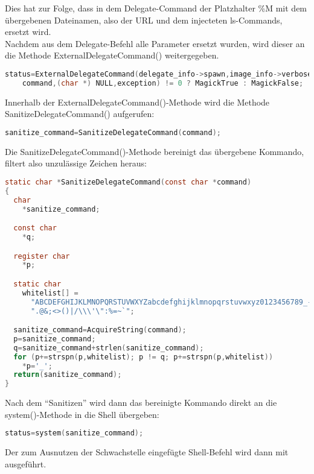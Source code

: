 Dies hat zur Folge, dass in dem Delegate-Command der Platzhalter \%M mit dem übergebenen Dateinamen,
also der URL und dem injecteten ls-Commands, ersetzt wird.\\

Nachdem aus dem Delegate-Befehl alle Parameter ersetzt wurden, wird dieser an die Methode ExternalDelegateCommand() weitergegeben.

\begin{lstlisting}[firstnumber=1301, language=C, caption=magick/delegate.c Aufruf ExternalDelegateCommand(),label={lst:lstlisting}]
  status=ExternalDelegateCommand(delegate_info->spawn,image_info->verbose,
    command,(char *) NULL,exception) != 0 ? MagickTrue : MagickFalse;
\end{lstlisting}
\vspace{5mm}

Innerhalb der ExternalDelegateCommand()-Methode wird die Methode SanitizeDelegateCommand() aufgerufen:\\

\begin{lstlisting}[firstnumber=395, language=C, caption=magick/delegate.c Aufruf SanitizeDelegateCommand(),label={lst:lstlisting}]
  sanitize_command=SanitizeDelegateCommand(command);
\end{lstlisting}
\vspace{5mm}

Die SanitizeDelegateCommand()-Methode bereinigt das übergebene Kommando, filtert also unzulässige Zeichen heraus:\\

\begin{lstlisting}[firstnumber=322, language=C, caption=magick/delegate.c SanitizieDelegateCommand(),label={lst:lstlisting}]
static char *SanitizeDelegateCommand(const char *command)
{
  char
    *sanitize_command;

  const char
    *q;

  register char
    *p;

  static char
    whitelist[] =
      "ABCDEFGHIJKLMNOPQRSTUVWXYZabcdefghijklmnopqrstuvwxyz0123456789_- "
      ".@&;<>()|/\\\'\":%=~`";

  sanitize_command=AcquireString(command);
  p=sanitize_command;
  q=sanitize_command+strlen(sanitize_command);
  for (p+=strspn(p,whitelist); p != q; p+=strspn(p,whitelist))
    *p='_';
  return(sanitize_command);
}
\end{lstlisting}
\vspace{5mm}

Nach dem "`Sanitizen"' wird dann das bereinigte Kommando direkt an die system()-Methode in die Shell übergeben:\\

\begin{lstlisting}[firstnumber=402, language=C, caption=magick/delegate.c Aufruf system(),label={lst:lstlisting}]
  status=system(sanitize_command);
\end{lstlisting}
\vspace{5mm}

Der zum Ausnutzen der Schwachstelle eingefügte Shell-Befehl wird dann mit ausgeführt.